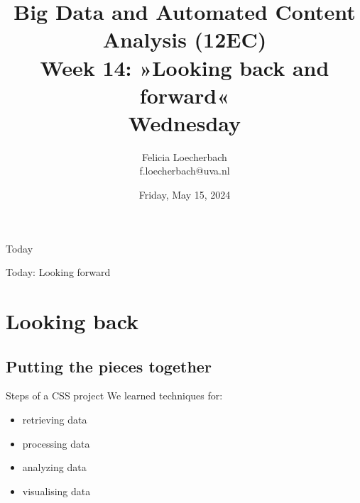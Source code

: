 \documentclass[compress]{beamer}
\begin{document}
\title[Big Data and Automated Content Analysis]{\textbf{Big Data and Automated Content Analysis (12EC)} 
\\Week 14: »Looking back and forward«
\\Wednesday}
\author[Felicia Loecherbach]{Felicia Loecherbach\\ \footnotesize{f.loecherbach@uva.nl \\}}
\date{Friday, May 15, 2024}


\begin{frame}{}
	\titlepage
\end{frame}

\begin{frame}{Today}
	\tableofcontents
\end{frame}


\begin{frame}[standout]
Today: Looking forward
\end{frame}




\section{Looking back}
\subsection{Putting the pieces together}


\begin{frame}{Steps of a CSS project}
We learned techniques for:
\begin{itemize}
\item retrieving data
\item processing data
\item analyzing data
\item visualising data
\end{itemize}
	
\end{frame}
\end{document}
